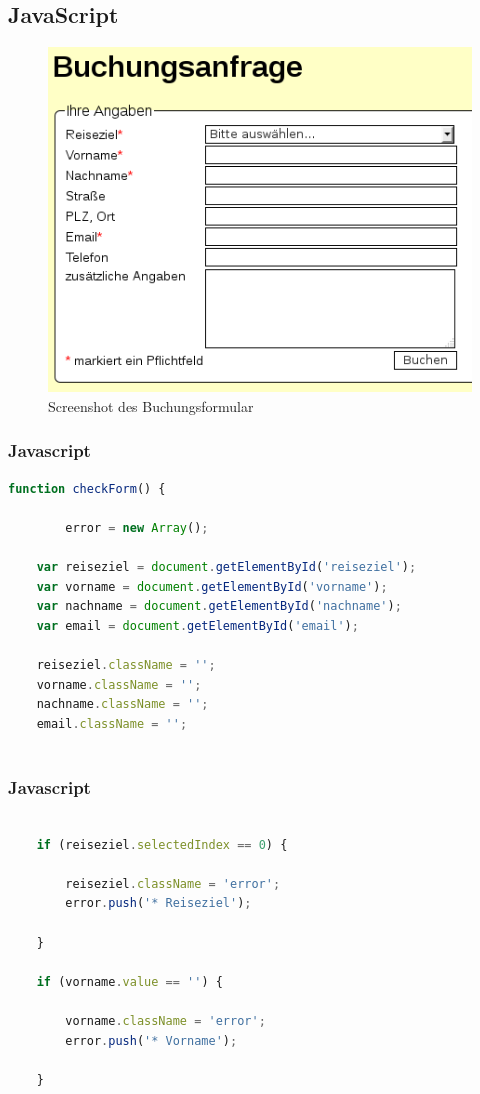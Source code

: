 \documentclass[xcolor=dvipsnames]{beamer}
\begin{document}
\subsection{JavaScript}
\begin{frame} %
	\begin{figure}
	\includegraphics[scale=0.5]{screenshot_buchung.png}
	\caption{Screenshot des Buchungsformular}
	\end{figure}
\end{frame}

\begin{frame}[fragile]
\frametitle{Javascript}

\begin{lstlisting}[language=javascript]
function checkForm() {

		error = new Array();

	var reiseziel = document.getElementById('reiseziel');
	var vorname = document.getElementById('vorname');
	var nachname = document.getElementById('nachname');
	var email = document.getElementById('email');

	reiseziel.className = '';
	vorname.className = '';
	nachname.className = '';
	email.className = '';
	


\end{lstlisting}
\end{frame}

\begin{frame}[fragile]
\frametitle{Javascript}

\begin{lstlisting}[language=javascript, firstnumber=14]
	
	if (reiseziel.selectedIndex == 0) {

		reiseziel.className = 'error';
		error.push('* Reiseziel');

	}

	if (vorname.value == '') {

		vorname.className = 'error';
		error.push('* Vorname');

	}


\end{lstlisting}
\end{frame}
\end{document}
